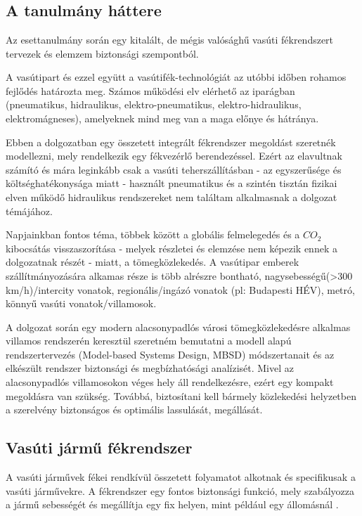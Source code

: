 \chapter{\caseStudy} \label{chap:cs}

\section{A tanulmány háttere}
Az esettanulmány során egy kitalált, de mégis valósághű vasúti fékrendszert tervezek és elemzem biztonsági szempontból.

A vasútipart és ezzel együtt a vasútifék-technológiát az utóbbi időben rohamos fejlődés határozta meg. 
Számos működési elv elérhető az iparágban (pneumatikus, hidraulikus, elektro-pneumatikus, elektro-hidraulikus, elektromágneses), amelyeknek mind meg van a maga előnye és hátránya.

Ebben a dolgozatban egy összetett integrált fékrendszer megoldást szeretnék modellezni, mely rendelkezik egy fékvezérlő berendezéssel.
Ezért az elavultnak számító és mára leginkább csak a vasúti teherszállításban - az egyszerűsége és költséghatékonysága miatt - használt pneumatikus és a szintén tisztán fizikai elven működő hidraulikus rendszereket nem találtam alkalmasnak a dolgozat témájához.

Napjainkban fontos téma, többek között a globális felmelegedés és a ${CO}_2$ kibocsátás visszaszorítása - melyek részletei és elemzése nem képezik ennek a dolgozatnak részét - miatt, a tömegközlekedés.
A vasútipar emberek szállítmányozására alkamas része is több alrészre bontható, nagysebességű(>300 km/h)/intercity vonatok, 
regionális/ingázó vonatok (pl: Budapesti HÉV), metró, könnyű vasúti vonatok/villamosok.

A dolgozat során egy modern alacsonypadlós városi tömegközlekedésre alkalmas villamos rendszerén keresztül szeretném bemutatni a modell alapú rendszertervezés (Model-based Systems Design, MBSD) módszertanait és az elkészült rendszer biztonsági és megbízhatósági analízisét. 
Mivel az alacsonypadlós villamosokon véges hely áll rendelkezésre, ezért egy kompakt megoldásra van szükség. 
Továbbá, biztosítani kell bármely közlekedési helyzetben a szerelvény biztonságos és optimális lassulását, megállását.

\section{Vasúti jármű fékrendszer} \label{sec:vjfr}
A vasúti járművek fékei rendkívül összetett folyamatot alkotnak és specifikusak a vasúti járművekre.
A fékrendszer egy fontos biztonsági funkció, mely szabályozza a jármű sebességét és megállítja egy fix helyen, mint például egy állomásnál \cite{13452-1}.

